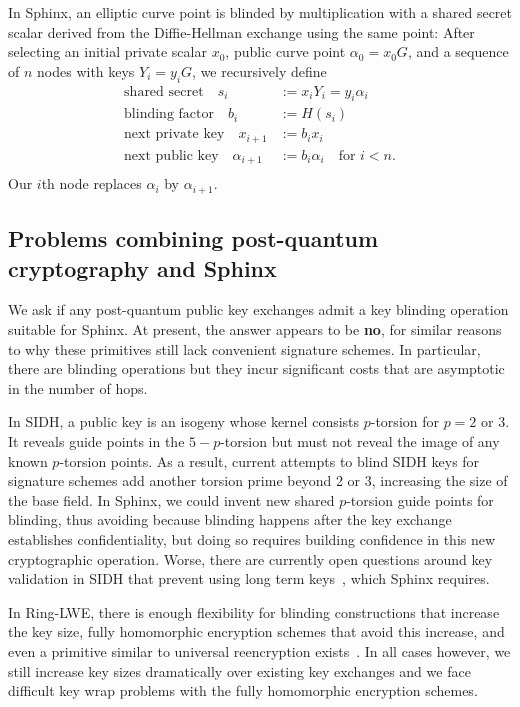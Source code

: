 \documentclass[twoside,letterpaper]{llncs}
\def\mathcomma{}
\begin{document}
In Sphinx, an elliptic curve point is blinded by multiplication with
a shared secret scalar derived from the Diffie-Hellman exchange using
the same point:
After selecting an initial private scalar $x_0$,
 public curve point $\alpha_0 = x_0 G$, and 
 a sequence of $n$ nodes with keys $Y_i = y_i G$,
we recursively define 
\[ \begin{aligned}
\textrm{shared secret}\quad
 s_i &:= x_i Y_i = y_i \alpha_i \mathcomma \\
\textrm{blinding factor}\quad
 b_i &:= H(s_i) \mathcomma \\
\textrm{next private key}\quad
 x_{i+1} &:= b_i x_i \mathcomma \\ %
\textrm{next public key}\quad
 \alpha_{i+1} &:= b_i \alpha_i \quad\textrm{for $i < n$.} \\
\end{aligned} \]
Our $i$th node replaces $\alpha_i$ by $\alpha_{i+1}$.


\subsection{Problems combining post-quantum cryptography and Sphinx}

We ask if any post-quantum public key exchanges admit 
a key blinding operation suitable for Sphinx. 
At present, the answer appears to be {\bf no}, for similar reasons to
why these primitives still lack convenient signature schemes. 
In particular, there are blinding operations but they incur significant
costs  that are asymptotic in the number of hops.

In SIDH, a public key is an isogeny whose kernel consists $p$-torsion
for $p=2$ or $3$.  It reveals guide points in the $5-p$-torsion but
must not reveal the image of any known $p$-torsion points.  
As a result, current attempts to blind SIDH keys for signature schemes
add another torsion prime beyond 2 or 3, increasing the size of the
base field.  In Sphinx, we could invent new shared $p$-torsion guide
points for blinding, thus avoiding
because blinding happens after the key exchange
establishes confidentiality, but doing so requires building confidence
in this new cryptographic operation.  Worse, there are currently open
questions around key validation in SIDH that prevent using long term
keys~\cite{SIDH-NoValidation}, which Sphinx requires.

In Ring-LWE, there is enough flexibility for blinding constructions
that increase the key size, fully homomorphic encryption schemes that
avoid this increase, and even a primitive similar to universal
reencryption exists~\cite{963628}.  In all cases however, we still
increase key sizes dramatically over existing key exchanges and we face
difficult key wrap problems with the fully homomorphic encryption
schemes.
\end{document}
